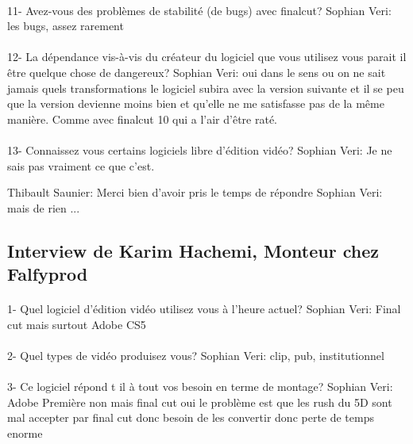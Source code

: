         \paragraph{}
          11- Avez-vous des problèmes de stabilité (de bugs) avec finalcut?
              Sophian Veri: les bugs, assez rarement

        \paragraph{}
          12- La dépendance vis-à-vis du créateur du logiciel que vous utilisez
                vous parait il être quelque chose de dangereux?
              Sophian Veri: oui dans le sens ou on ne sait jamais quels transformations le
              logiciel subira avec la version suivante et il se peu que la version devienne
              moins bien et qu'elle ne me satisfasse pas de la même manière. Comme avec
              finalcut 10 qui a l'air d'être raté.

        \paragraph{}
          13- Connaissez vous certains logiciels libre d'édition vidéo?
              Sophian Veri: Je ne sais pas vraiment ce que c'est.

          Thibault Saunier: Merci bien d'avoir pris le temps de répondre
          Sophian Veri: mais de rien
          ...

    \subsection {Interview de Karim Hachemi, Monteur chez Falfyprod}

        \paragraph{}
         1-  Quel logiciel d'édition vidéo utilisez vous à l'heure actuel?
            Sophian Veri: Final cut mais surtout Adobe CS5

        \paragraph{}
         2- Quel types de vidéo produisez vous?
            Sophian Veri: clip, pub, institutionnel

        \paragraph{}
         3- Ce logiciel répond t il à tout vos besoin en terme de montage?
            Sophian Veri: Adobe Première non mais final cut oui le problème est que les
            rush du 5D sont mal accepter par final cut donc besoin de les
            convertir donc perte de temps enorme

